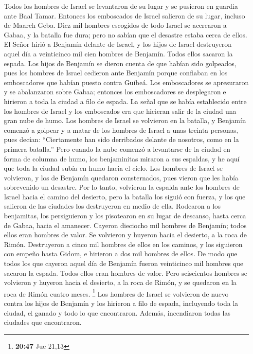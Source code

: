 \begin{paracol}{2}
 Todos los hombres de Israel se levantaron de su lugar y
se pusieron en guardia ante Baal Tamar. Entonces los emboscados de
Israel salieron de su lugar, incluso de Maareh Geba. 
Diez mil hombres escogidos de todo Israel se acercaron a Gabaa, y la
batalla fue dura; pero no sabían que el desastre estaba cerca de ellos.
 El Señor hirió a Benjamín delante de Israel, y los hijos
de Israel destruyeron aquel día a veinticinco mil cien hombres de
Benjamín. Todos ellos sacaron la espada.  Los hijos de
Benjamín se dieron cuenta de que habían sido golpeados, pues los hombres
de Israel cedieron ante Benjamín porque confiaban en los emboscadores
que habían puesto contra Guibeá.  Los emboscadores se
apresuraron y se abalanzaron sobre Gabaa; entonces los emboscadores se
desplegaron e hirieron a toda la ciudad a filo de espada.
 La señal que se había establecido entre los hombres de
Israel y los emboscados era que hicieran salir de la ciudad una gran
nube de humo.  Los hombres de Israel se volvieron en la
batalla, y Benjamín comenzó a golpear y a matar de los hombres de Israel
a unas treinta personas, pues decían: ``Ciertamente han sido derribados
delante de nosotros, como en la primera batalla.''  Pero
cuando la nube comenzó a levantarse de la ciudad en forma de columna de
humo, los benjaminitas miraron a sus espaldas, y he aquí que toda la
ciudad subía en humo hacia el cielo.  Los hombres de
Israel se volvieron, y los de Benjamín quedaron consternados, pues
vieron que les había sobrevenido un desastre.  Por lo
tanto, volvieron la espalda ante los hombres de Israel hacia el camino
del desierto, pero la batalla los siguió con fuerza, y los que salieron
de las ciudades los destruyeron en medio de ella. 
Rodearon a los benjamitas, los persiguieron y los pisotearon en su lugar
de descanso, hasta cerca de Gabaa, hacia el amanecer. 
Cayeron dieciocho mil hombres de Benjamín; todos ellos eran hombres de
valor.  Se volvieron y huyeron hacia el desierto, a la
roca de Rimón. Destruyeron a cinco mil hombres de ellos en los caminos,
y los siguieron con empeño hasta Gidom, e hirieron a dos mil hombres de
ellos.  De modo que todos los que cayeron aquel día de
Benjamín fueron veinticinco mil hombres que sacaron la espada. Todos
ellos eran hombres de valor.  Pero seiscientos hombres se
volvieron y huyeron hacia el desierto, a la roca de Rimón, y se quedaron
en la roca de Rimón cuatro meses. \footnote{\textbf{20:47} Jue 21,13}
 Los hombres de Israel se volvieron de nuevo contra los
hijos de Benjamín y los hirieron a filo de espada, incluyendo toda la
ciudad, el ganado y todo lo que encontraron. Además, incendiaron todas
las ciudades que encontraron.


\end{paracol}
